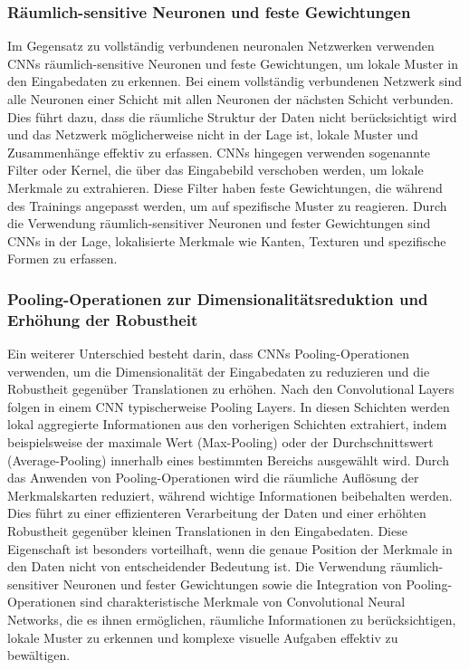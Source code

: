 \subsubsection{Räumlich-sensitive Neuronen und feste Gewichtungen}

    Im Gegensatz zu vollständig verbundenen neuronalen Netzwerken verwenden CNNs räumlich-sensitive Neuronen und feste Gewichtungen, um lokale Muster in den Eingabedaten zu erkennen. 
    Bei einem vollständig verbundenen Netzwerk sind alle Neuronen einer Schicht mit allen Neuronen der nächsten Schicht verbunden. 
    Dies führt dazu, dass die räumliche Struktur der Daten nicht berücksichtigt wird und das Netzwerk möglicherweise nicht in der Lage ist, lokale Muster und Zusammenhänge effektiv zu erfassen. 
    CNNs hingegen verwenden sogenannte Filter oder Kernel, die über das Eingabebild verschoben werden, um lokale Merkmale zu extrahieren. 
    Diese Filter haben feste Gewichtungen, die während des Trainings angepasst werden, um auf spezifische Muster zu reagieren. 
    Durch die Verwendung räumlich-sensitiver Neuronen und fester Gewichtungen sind CNNs in der Lage, lokalisierte Merkmale wie Kanten, Texturen und spezifische Formen zu erfassen.

    \subsubsection{Pooling-Operationen zur Dimensionalitätsreduktion und Erhöhung der Robustheit}
    
        Ein weiterer Unterschied besteht darin, dass CNNs Pooling-Operationen verwenden, um die Dimensionalität der Eingabedaten zu reduzieren und die Robustheit gegenüber Translationen zu erhöhen. 
        Nach den Convolutional Layers folgen in einem CNN typischerweise Pooling Layers. 
        In diesen Schichten werden lokal aggregierte Informationen aus den vorherigen Schichten extrahiert, indem beispielsweise der maximale Wert (Max-Pooling) oder der Durchschnittswert (Average-Pooling) innerhalb eines bestimmten Bereichs ausgewählt wird. 
        Durch das Anwenden von Pooling-Operationen wird die räumliche Auflösung der Merkmalskarten reduziert, während wichtige Informationen beibehalten werden. 
        Dies führt zu einer effizienteren Verarbeitung der Daten und einer erhöhten Robustheit gegenüber kleinen Translationen in den Eingabedaten. 
        Diese Eigenschaft ist besonders vorteilhaft, wenn die genaue Position der Merkmale in den Daten nicht von entscheidender Bedeutung ist.
        Die Verwendung räumlich-sensitiver Neuronen und fester Gewichtungen sowie die Integration von Pooling-Operationen sind charakteristische Merkmale von Convolutional Neural Networks, die es ihnen ermöglichen, räumliche Informationen zu berücksichtigen, lokale Muster zu erkennen und komplexe visuelle Aufgaben effektiv zu bewältigen.

